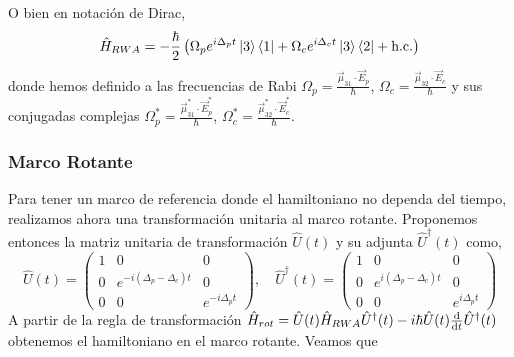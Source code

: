 O bien en notación de Dirac,
\begin{equation}
\hat{H}_{RWA} = - \frac{\hbar}{2} \left( \Omega_p e^{i \Delta_p t} \ket{3}\bra{1} + \Omega_c e^{i \Delta_c t} \ket{3}\bra{2} + \text{h.c.} \right)
\end{equation}
donde hemos definido a las frecuencias de Rabi $\Omega_p = \frac{\vec{\mu}_{31} \cdot \vec{E}_p}{\hbar}$,  $\Omega_c = \frac{\vec{\mu}_{32} \cdot \vec{E}_c}{\hbar}$ y sus conjugadas complejas $\Omega_p^* = \frac{\vec{\mu}_{31}^* \cdot \vec{E}_p^*}{\hbar}$,  $\Omega_c^* = \frac{\vec{\mu}_{32}^* \cdot \vec{E}_c^*}{\hbar}$.

\subsubsection*{Marco Rotante}
Para tener un marco de referencia donde el hamiltoniano no dependa del tiempo, realizamos ahora una transformación unitaria al marco rotante. Proponemos entonces la matriz unitaria de transformación $\hat{U}(t)$ y su adjunta $\hat{U}^{\dagger}(t)$ como,
\begin{equation}
    \hat{U}(t)= \begin{pmatrix}
    1 & 0 & 0 \\
    0 & e^{-i(\Delta_p-\Delta_c) t} & 0 \\
    0 & 0 & e^{-i\Delta_p t}
    \end{pmatrix}, \quad
    \hat{U}^{\dagger}(t)= \begin{pmatrix}
    1 & 0 & 0 \\
    0 & e^{i(\Delta_p-\Delta_c) t} & 0 \\
    0 & 0 & e^{i\Delta_p t}
    \end{pmatrix}
\end{equation}
A partir de la regla de transformación $\hat{H}_{rot} = \hat{U}(t) \hat{H}_{RWA} \hat{U}^{\dagger}(t) - i \hbar \hat{U}(t) \dv{t} \hat{U}^{\dagger}(t)$ obtenemos el hamiltoniano en el marco rotante. Veamos que
